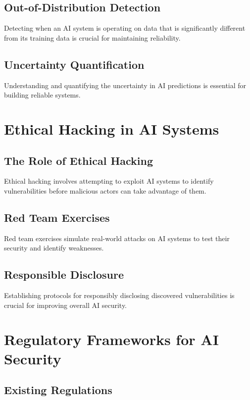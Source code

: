 \subsection{Out-of-Distribution Detection}

Detecting when an AI system is operating on data that is significantly
different from its training data is crucial for maintaining reliability.

\subsection{Uncertainty Quantification}

Understanding and quantifying the uncertainty in AI predictions is
essential for building reliable systems.

\section{Ethical Hacking in AI Systems}

\subsection{The Role of Ethical Hacking}

Ethical hacking involves attempting to exploit AI systems to identify
vulnerabilities before malicious actors can take advantage of them.

\subsection{Red Team Exercises}

Red team exercises simulate real-world attacks on AI systems to test
their security and identify weaknesses.

\subsection{Responsible Disclosure}

Establishing protocols for responsibly disclosing discovered
vulnerabilities is crucial for improving overall AI security.

\section{Regulatory Frameworks for AI Security}

\subsection{Existing Regulations}

